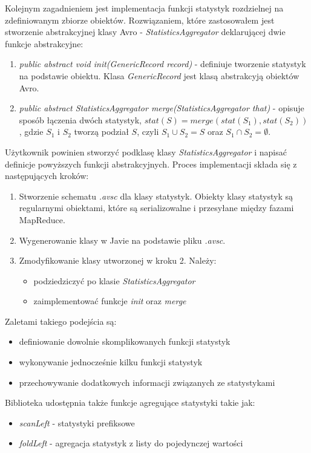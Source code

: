 \documentclass{pracamgr}
\begin{document}
Kolejnym zagadnieniem jest implementacja funkcji statystyk rozdzielnej na zdefiniowanym zbiorze obiektów. Rozwiązaniem, które zastosowałem jest stworzenie abstrakcyjnej klasy Avro -  \textit{StatisticsAggregator} deklarującej dwie funkcje abstrakcyjne:
\begin{enumerate}
    \item \textit{public abstract void init(GenericRecord record)} - definiuje tworzenie statystyk na podstawie obiektu. Klasa \textit{GenericRecord} jest klasą abstrakcyją obiektów Avro.
    \item \textit{public abstract StatisticsAggregator merge(StatisticsAggregator that)} - opisuje sposób łączenia dwóch statystyk, \(stat(S) = merge(stat(S_1), stat(S_2))\), gdzie \(S_1\) i \(S_2\) tworzą podział \(S\), czyli \(S_1 \cup S_2 = S\) oraz \(S_1 \cap S_2 = \emptyset\).
\end{enumerate}

Użytkownik powinien stworzyć podklasę klasy \textit{StatisticsAggregator} i napisać definicje powyższych funkcji abstrakcyjnych. Proces implementacji składa się z następujących kroków:
\begin{enumerate}
    \item Stworzenie schematu \textit{.avsc} dla klasy statystyk. Obiekty klasy statystyk są regularnymi obiektami, które są serializowalne i przesyłane między fazami MapReduce.
    \item Wygenerowanie klasy w Javie na podstawie pliku \textit{.avsc}.
    \item Zmodyfikowanie klasy utworzonej w kroku 2. Należy:
        \begin{itemize}
            \item podziedziczyć po klasie \textit{StatisticsAggregator}
            \item zaimplementować funkcje \textit{init} oraz \textit{merge}
        \end{itemize}
\end{enumerate}

Zaletami takiego podejścia są:
\begin{itemize}
    \item definiowanie dowolnie skomplikowanych funkcji statystyk
    \item wykonywanie jednocześnie kilku funkcji statystyk
    \item przechowywanie dodatkowych informacji związanych ze statystykami
\end{itemize}

Biblioteka udostępnia także funkcje agregujące statystyki takie jak:
\begin{itemize}
    \item \textit{scanLeft} - statystyki prefiksowe
    \item \textit{foldLeft} - agregacja statystyk z listy do pojedynczej wartości
\end{itemize}
\end{document}
